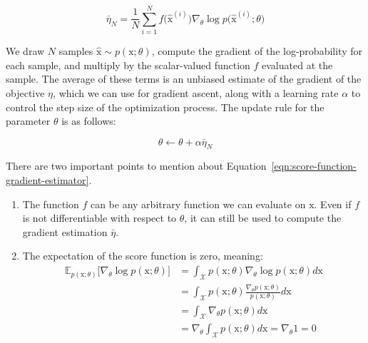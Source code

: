 \begin{equation}\label{eqn:score-function-gradient-estimator}
    \bar{\eta}_{N} = \frac{1}{N}\sum_{i=1}^{N}f\big(\hat{\mathrm{x}}^{(i)}\big) \nabla_{\theta}\log p\big(\hat{\mathrm{x}}^{(i)};\theta\big)
\end{equation}

\noindent We draw $N$ samples $\hat{\mathrm{x}}\sim p(\mathrm{x};\theta)$, compute the gradient of the log-probability for each sample, and multiply by the scalar-valued function $f$ evaluated at the sample. The average of these terms is an unbiased estimate of the gradient of the objective $\eta$, which we can use for gradient ascent, along with a learning rate $\alpha$ to control the step size of the optimization process. The update rule for the parameter $\theta$ is as follows:

\begin{equation}\label{eqn:gradient-ascent}
    \theta \leftarrow \theta + \alpha \bar{\eta}_{N}
\end{equation}

\noindent There are two important points to mention about Equation~\ref{eqn:score-function-gradient-estimator}.

\begin{enumerate}
    \item The function $f$ can be any arbitrary function we can evaluate on $\mathrm{x}$. Even if $f$ is not differentiable with respect to $\theta$, it can still be used to compute the gradient estimation $\bar{\eta}$.
    \item The expectation of the score function is zero, meaning: 
    \begin{equation}\label{eqn:score-function-expectation-zero}
    \begin{split}
        \mathbb{E}_{p(\mathrm{x};\theta)}\big[\nabla_{\theta}\log p(\mathrm{x};\theta)\big] 
        &= \int_{\mathcal{X}}p(\mathrm{x};\theta)\nabla_{\theta}\log p(\mathrm{x}; \theta) d\mathrm{x} \\
        &= \int_{\mathcal{X}} p(\mathrm{x};\theta)\frac{\nabla_{\theta} p(\mathrm{x}; \theta)}{p(\mathrm{x};\theta)}d\mathrm{x} \\
        &= \int_{\mathcal{X}}\nabla_{\theta}p(\mathrm{x};\theta)d\mathrm{x} \\
        &= \nabla_{\theta}\int_{\mathcal{X}} p(\mathrm{x}; \theta)d\mathrm{x} = \nabla_{\theta} 1 =0
    \end{split}
    \end{equation}
\end{enumerate}

